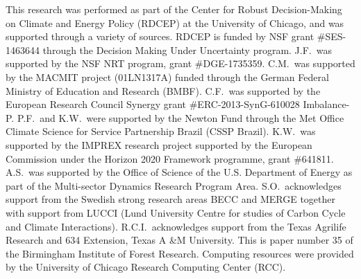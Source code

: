 \documentclass[gmd, manuscript]{copernicus} %
\begin{document}

\begin{acknowledgements}
This research was performed as part of the Center for Robust Decision-Making on Climate and Energy Policy (RDCEP) at the University of Chicago, and was supported through a variety of sources. 
RDCEP is funded by NSF grant \#SES-1463644 through the Decision Making Under Uncertainty program. 
J.F.\ was supported by the NSF NRT program, grant \#DGE-1735359. 
C.M.\ was supported by the MACMIT project (01LN1317A) funded through the German Federal Ministry of Education and Research (BMBF). 
C.F.\ was supported by the European Research Council Synergy grant \#ERC-2013-SynG-610028 Imbalance-P. 
P.F.\ and K.W.\ were supported  by the Newton Fund through the Met Office Climate Science for Service Partnership Brazil (CSSP Brazil). 
K.W.\ was supported by the IMPREX research project supported by the European Commission under the Horizon 2020 Framework programme, grant \#641811. 
A.S.\ was supported by the Office of Science of the U.S. Department of Energy as part of the Multi-sector Dynamics Research Program Area. 
S.O.\ acknowledges support from the Swedish strong research areas BECC and MERGE together with support from LUCCI (Lund University Centre for studies of Carbon Cycle and Climate Interactions). 
R.C.I.\ acknowledges support from the Texas Agrilife Research and 634 Extension, Texas A \&M University. This is paper number 35 of the Birmingham Institute of Forest Research. Computing resources were provided by the University of Chicago Research Computing Center (RCC).
\end{acknowledgements}



\end{document}
